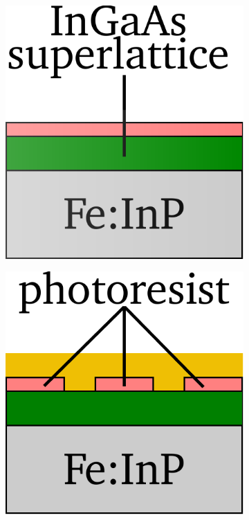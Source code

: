 \begin{figure}[!]
    \centering
    \begin{subfigure}[b]{0.21\textwidth}
        \centering
        \includegraphics[width=\textwidth]{figures/Fabrication/fab1_1.pdf}
        \caption{\centering}
        \label{fig:fab11}
    \end{subfigure}
    \hfill
    \begin{subfigure}[b]{0.21\textwidth}
        \centering
        \includegraphics[width=\textwidth]{figures/Fabrication/fab1_2.pdf}

\end{subfigure}
\end{figure}
